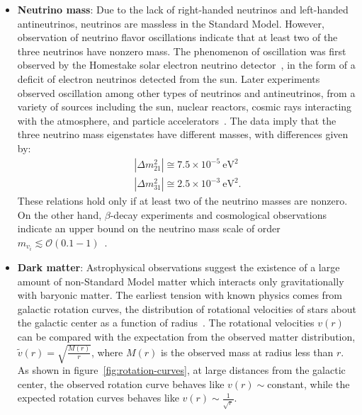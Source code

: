 \begin{itemize}
	\item \textbf{Neutrino mass}: Due to the lack of right-handed neutrinos and left-handed antineutrinos, neutrinos are massless in the Standard Model. However, observation of neutrino flavor oscillations indicate that at least two of the three neutrinos have nonzero mass. The phenomenon of oscillation was first observed by the Homestake solar electron neutrino detector~\cite{Cleveland:1998nv}, in the form of a deficit of electron neutrinos detected from the sun. Later experiments observed oscillation among other types of neutrinos and antineutrinos, from a variety of sources including the sun, nuclear reactors, cosmic rays interacting with the atmosphere, and particle accelerators~\cite{pdg}. The data imply that the three neutrino mass eigenstates have different masses, with differences given by:
	\begin{align}\label{eqn:neutrino-mass-differences}
		|\Delta m_{21}^2| \cong 7.5\times 10^{-5}~\mbox{eV}^2 \\
		|\Delta m_{31}^2| \cong 2.5\times 10^{-3}~\mbox{eV}^2.
	\end{align}
	These relations hold only if at least two of the neutrino masses are nonzero. On the other hand, $\beta$-decay experiments and cosmological observations indicate an upper bound on the neutrino mass scale of order $m_{v_i} \lesssim \mathcal{O}(0.1-1)$~\cite{Troitzk, CMB/WMAP, Planck}.

	\item \textbf{Dark matter}: Astrophysical observations suggest the existence of a large amount of non-Standard Model matter which interacts only gravitationally with baryonic matter. The earliest tension with known physics comes from galactic rotation curves, the distribution of rotational velocities of stars about the galactic center as a function of radius~\cite{1980ApJ_238_471R}. The rotational velocities $v(r)$ can be compared with the expectation from the observed matter distribution, $\tilde{v}(r)=\sqrt{\frac{M(r)}{r}}$, where $M(r)$ is the observed mass at radius less than $r$. As shown in figure~\ref{fig:rotation-curves}, at large distances from the galactic center, the observed rotation curve behaves like $v(r)\sim$constant, while the expected rotation curves behaves like $v(r)\sim \frac{1}{\sqrt{r}}$. 


\end{itemize}
